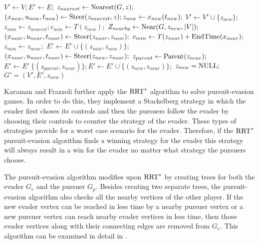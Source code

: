 \begin{algorithm}
\caption{$\textnormal{Extend}(G,z)$ \cite{karaman}}\label{extend}
\begin{algorithmic}[1]
	\State $V' \leftarrow V; E' \leftarrow E;$
	\State $z_{nearest} \leftarrow \textnormal{Nearest}(G,z);$
	\State $(x_{new},u_{new},t_{new}) \leftarrow \textnormal{Steer}(z_{nearest},z); z_{new} \leftarrow x_{new}(t_{new});$
		\State $V' \leftarrow V' \cup \{z_{new}\};$
		\State $z_{min} \leftarrow z_{nearest}; c_{min} \leftarrow T(z_{new});$
		\State $Z_{nearby} \leftarrow \textnormal{Near}(G,z_{new},|V|);$
		 \do{}
			\State $(x_{near},u_{near},t_{near}) \leftarrow \textnormal{Steer}(z_{near},z_{new});$
				\State $c_{min} \leftarrow T(z_{near})+\textnormal{EndTime}(x_{near});$
				\State $z_{min} \leftarrow z_{near};$
			\EndIf
		\EndFor
		\State $E' \leftarrow E' \cup \{(z_{min},z_{new})\};$
		 \do{}
			\State $(x_{near},u_{near},t_{near}) \leftarrow \textnormal{Steer}(z_{new},z_{near});$
				\State $z_{parent} \leftarrow \textnormal{Parent}(z_{near});$
				\State $E' \leftarrow E' \ \{(z_{parent},z_{near})\};E' \leftarrow E' \cup \{(z_{new},z_{near})\};$
			\EndIf
		\EndFor
		\Else
			\State $z_{new} = \textnormal{NULL};$
	\EndIf
	\State
	\Return $G' = (V',E',z_{new})$
\end{algorithmic}
\end{algorithm}

Karaman and Frazzoli further apply the $\textnormal{RRT}^*$ algorithm to solve pursuit-evasion games. In order to do this, they implement a Stackelberg strategy in which the evader first choses its controls and then the pursuers  follow the evader by choosing their controls to counter the strategy of the evader. These types of strategies provide for a worst case scenario for the evader. Therefore, if the $\textnormal{RRT}^*$ pursuit-evasion algorithm finds a winning strategy for the evader this strategy will always result in a win for the evader no matter what strategy the pursuers choose.

The pursuit-evasion algorithm modifies upon $\textnormal{RRT}^*$ by creating trees for both the evader $G_e$ and the pursuer $G_p$. Besides creating two separate trees, the pursuit-evasion algorithm also checks all the nearby vertices of the other player. If the new evader vertex can be reached in less time by a nearby pursuer vertex or a new pursuer vertex can reach nearby evader vertices in less time, then those evader vertices along with their connecting edges are removed from $G_e$. This algorithm can be examined in detail in  \cite{karaman}.
         
